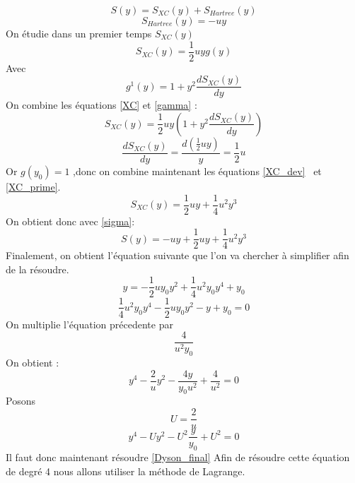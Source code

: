 \documentclass[12pt]{article}
\begin{document}
\begin{equation}
\label{sigma}
	S(y) = S_{XC}(y) + S_{Hartree}(y)
\end{equation}
\begin{equation}
\label{Hartree} 
	S_{Hartree}(y) = -uy
\end{equation}
On \'etudie dans un premier temps $S_{XC}(y)$ 
\begin{equation}
\label{XC} 
	S_{XC}(y) = \frac{1}{2} u y g(y)
\end{equation}
Avec
\begin{equation} 
\label{gamma} 
	g^1(y) = 1 + y^2 \frac{dS_{XC}(y)}{dy} 
\end{equation}
On combine les \'equations \ref{XC} et \ref{gamma} : 
\begin{equation} 
\label{XC_dev}
	S_{XC}(y) = \frac{1}{2} u y (1 + y^2 \frac{dS_{XC}(y)}{dy})
\end{equation}
\begin{equation} 
\label{XC_prime} 
	\frac{dS_{XC}(y)}{dy} = \frac{d(\frac{1}{2} u y )}{y} = \frac{1}{2} u 
\end{equation}
Or $g(y_0) = 1$ ,donc on combine maintenant les \'equations \ref{XC_dev}  et \ref{XC_prime}.
\begin{equation}
\label{XC_final} 
	S_{XC}(y) = \frac{1}{2} u y + \frac{1}{4} u^2 y^3 
\end{equation}
On obtient donc avec \ref{sigma}: 
\begin{equation}
\label{Sigma_final} 
	S(y) = -uy +  \frac{1}{2} u y + \frac{1}{4} u^2 y^3 
\end{equation}
Finalement, on obtient l'\'equation suivante que l'on va chercher \`a simplifier afin de la r\'esoudre.
\begin{equation}
	y = -\frac{1}{2} u y_0 y^2 + \frac{1}{4} u^2 y_0 y^4 + y_0
\end{equation}
\begin{equation}
	\frac{1}{4} u^2 y_0 y^4 -\frac{1}{2} u y_0 y^2 - y + y_0 = 0
\end{equation}
On multiplie l'\'equation pr\'ecedente par $$ \frac{4}{u^2 y_0}$$
On obtient : 
\begin{equation}
	y^4 -\frac{2}{u} y^2 - \frac{4y}{y_0  u^2} + \frac{4}{u^2} = 0
\end{equation}
Posons $$ U = \frac{2}{u}$$
\begin{equation}
\label{Dyson_final} 
	y^4 - U y^2 - U^2\frac{y}{y_0} + U^2 = 0
\end{equation}
Il faut donc maintenant r\'esoudre \ref{Dyson_final}
%
Afin de résoudre cette \'equation de degr\'e 4 nous allons utiliser la m\'ethode de Lagrange.
\end{document}
